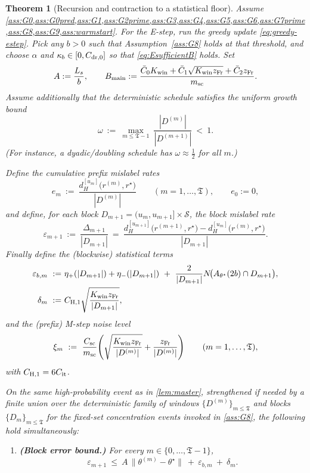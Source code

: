 \documentclass{statsoc}
\newtheorem{theorem}{Theorem}[section]
\newcommand{\1}{\mathbbm{1}}
\newcommand{\Tmax}{\mathfrak{T}}
\begin{document}
\begin{theorem}[Recursion and contraction to a statistical floor]\label{thm:contract}
Assume \cref{ass:G0,ass:G0pred,ass:G1,ass:G2prime,ass:G3,ass:G4,ass:G5,ass:G6,ass:G7prime,ass:G8,ass:G9,ass:warmstart}. 
For the E-step, run the greedy update \eqref{eq:greedy-estep}. Pick any \(b>0\) such that Assumption~\ref{ass:G8} holds at that threshold, and choose \(\alpha\) and \(\kappa_b\in[0,C_{\rm dr,0}]\) so that \eqref{eq:EsufficientB} holds.
Set
\[
A:=\frac{L_s}{b},\qquad B_{\rm main}:=\frac{\bar C_0 K_{\rm win}+\bar C_1\sqrt{K_{\rm win} z_{\rm Fr}}+\bar C_2 z_{\rm Fr}}{m_{\rm sc}}.
\]
Assume additionally that the deterministic schedule satisfies the uniform growth bound
\begin{equation}\label{eq:block-omega}
\omega\ :=\ \max_{m\le \Tmax-1}\ \frac{|D^{(m)}|}{|D^{(m+1)}|}\ <\ 1.
\end{equation}
(For instance, a dyadic/doubling schedule has $\omega\approx\tfrac12$ for all $m$.)

Define the cumulative prefix mislabel rates
\[
e_m\ :=\ \frac{d_H^{[u_m]}\!\big(r^{(m)},r^\star\big)}{|D^{(m)}|}\qquad(m=1,\dots,\Tmax),
\qquad e_0:=0,
\]
and define, for each block $D_{m+1}=(u_m,u_{m+1}]\times\mathcal S$, the block mislabel rate
\[
\varepsilon_{m+1}\ :=\ \frac{\Delta_{m+1}}{|D_{m+1}|}
\ =\ \frac{d_H^{[u_{m+1}]}\!\big(r^{(m+1)},r^\star\big)-d_H^{[u_m]}\!\big(r^{(m)},r^\star\big)}{|D_{m+1}|}.
\]
Finally define the (blockwise) statistical terms
\begin{align*}
\varepsilon_{b,m}\ :=&\ \eta_+(|D_{m+1}|)+\eta_-(|D_{m+1}|)\ +\ \frac{2}{|D_{m+1}|}N\!\big(A_{\theta^\star}(2b)\cap D_{m+1}\big),\\
\delta_{m}\ :=&\ C_{\rm H,1}\sqrt{\frac{K_{\rm win} z_{\rm Fr}}{|D_{m+1}|}},
\end{align*}
and the (prefix) M-step noise level
\[
\xi_m\ :=\ \frac{C_{\rm sc}}{m_{\rm sc}}\!\left(\sqrt{\frac{K_{\rm win} z_{\rm Fr}}{|D^{(m)}|}} + \frac{z_{\rm Fr}}{|D^{(m)}|}\right)
\qquad(m=1,\dots,\Tmax),
\]
with $C_{\rm H,1}=6C_{\rm it}$.

On the same high-probability event as in \cref{lem:master}, strengthened if needed by a finite union over the
deterministic family of windows $\{D^{(m)}\}_{m\le\Tmax}$ and blocks $\{D_m\}_{m\le\Tmax}$ for the fixed-set concentration
events invoked in \cref{ass:G8}, the following hold simultaneously:
\begin{enumerate}[nosep,label=(\roman*)]
\item \textbf{(Block error bound.)} For every $m\in\{0,\dots,\Tmax-1\}$,
\begin{equation}\label{eq:block-mislabel-rate}
\varepsilon_{m+1}\ \le\ A\,\|\theta^{(m)}-\theta^\star\|\ +\ \varepsilon_{b,m}\ +\ \delta_m.
\end{equation}


\end{enumerate}
\end{theorem}
\end{document}
